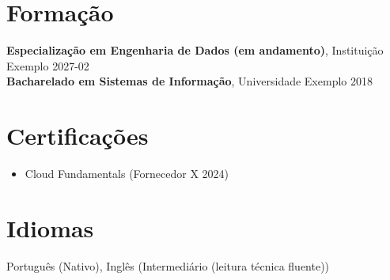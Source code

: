 \documentclass[10pt,a4paper]{article}
\begin{document}
\section*{Formação}

\textbf{Especialização em Engenharia de Dados (em andamento)}, Instituição Exemplo \hfill 2027-02\\
\textbf{Bacharelado em Sistemas de Informação}, Universidade Exemplo \hfill 2018\\

\section*{Certificações}

\begin{itemize}
  \item Cloud Fundamentals (Fornecedor X 2024)
\end{itemize}

\section*{Idiomas}

Português (Nativo), Inglês (Intermediário (leitura técnica fluente))
\end{document}

